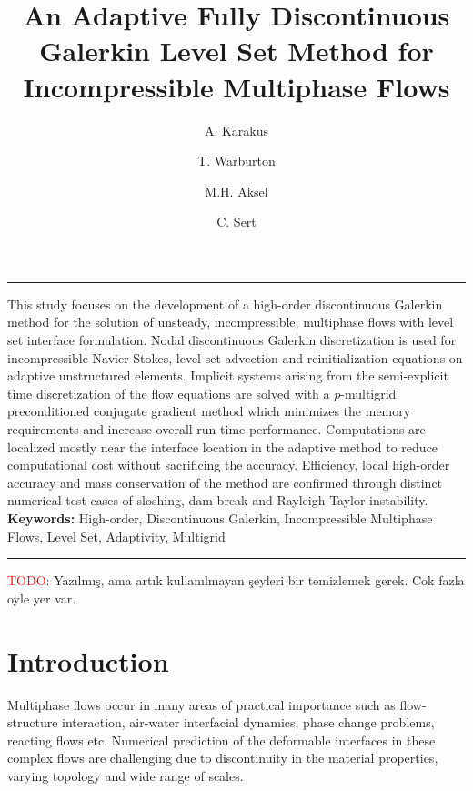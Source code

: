 \documentclass[11pt,a4paper,twoside]{article}
\renewenvironment{abstract}{%
	\begin{center}
		\begin{adjustbox}{minipage=0.90\textwidth,center} 
			\rule{\textwidth}{0.5pt}}
		{\par\noindent\rule{\textwidth}{0.5pt}  
		\end{adjustbox}
	\end{center} 
}
\begin{document}
	\title{An Adaptive Fully Discontinuous Galerkin Level Set Method for Incompressible Multiphase Flows}
	\author[1]{A. Karakus}
	\author[2]{T. Warburton}
	\author[1]{M.H. Aksel}
	\author[1]{C. Sert}
	
	\renewcommand\Authands{ and }
	\date{\vspace{-5ex}}
	
	\maketitle
	
	\begin{abstract}
		This study focuses on the development of a high-order discontinuous Galerkin method for the solution of unsteady, incompressible, multiphase flows with level set interface formulation.  Nodal discontinuous Galerkin discretization is used for incompressible Navier-Stokes, level set advection and reinitialization equations on adaptive unstructured elements. Implicit systems arising from the semi-explicit time discretization of  the flow equations are solved with a $ p $-multigrid preconditioned conjugate gradient method which minimizes the memory requirements and increase overall run time performance. Computations are localized mostly near the interface location in the adaptive method to reduce computational cost without sacrificing the accuracy. Efficiency, local high-order accuracy and mass conservation of the method are confirmed through distinct numerical test cases of sloshing, dam break and Rayleigh-Taylor instability. \\
		\textbf{Keywords:}  High-order, Discontinuous Galerkin, Incompressible Multiphase Flows,  Level Set, Adaptivity, Multigrid
	\end{abstract}

	
	\textcolor{red}{\textcolor{red}{TODO}}: Yazılmış, ama artık kullanılmayan şeyleri bir temizlemek gerek. Cok fazla oyle yer var.

	\section{Introduction}
	Multiphase flows occur in many areas of practical importance such as flow-structure interaction, air-water interfacial dynamics, phase change problems, reacting flows etc. Numerical prediction of the deformable interfaces in these complex flows are challenging due to discontinuity in the material properties, varying topology and wide range of scales.
		
\end{document}
